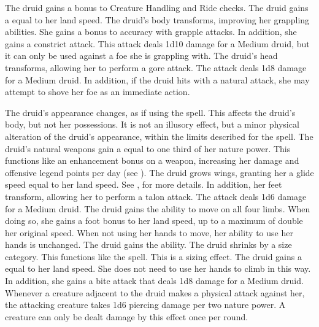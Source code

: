         The druid gains a  bonus to Creature Handling and Ride checks.
        The druid gains a  equal to her land speed.
        The druid's body transforms, improving her grappling abilities.
        She gains a  bonus to accuracy with grapple attacks.
        In addition, she gains a constrict attack.
        This attack deals 1d10 damage for a Medium druid, but it can only be used against a foe she is grappling with.
        The druid's head transforms, allowing her to perform a gore attack.
        The attack deals 1d8 damage for a Medium druid.
        In addition, if the druid hits with a natural attack, she may attempt to shove her foe as an immediate action.

        The druid's appearance changes, as if using the  spell.
        This affects the druid's body, but not her possessions.
        It is not an illusory effect, but a minor physical alteration of the druid's appearance, within the limits described for the spell.
        The druid's natural weapons gain a  equal to one third of her nature power.
        This functions like an enhancement bonus on a weapon, increasing her damage and offensive legend points per day (see ).
        The druid grows wings, granting her a glide speed equal to her land speed.
        See , for more details.
        In addition, her feet transform, allowing her to perform a talon attack.
        The attack deals 1d6 damage for a Medium druid.
        The druid gains the ability to move on all four limbs.
        When doing so, she gains a  foot bonus to her land speed, up to a maximum of double her original speed.
        When not using her hands to move, her ability to use her hands is unchanged.
        The druid gains the  ability.
        The druid shrinks by a size category.
        This functions like the  spell.
        This is a sizing effect.
        The druid gains a  equal to her land speed.
        She does not need to use her hands to climb in this way.
        In addition, she gains a bite attack that deals 1d8 damage for a Medium druid.
        Whenever a creature adjacent to the druid makes a physical attack against her, the attacking creature takes 1d6 piercing damage per two nature power.
        A creature can only be dealt damage by this effect once per round.

